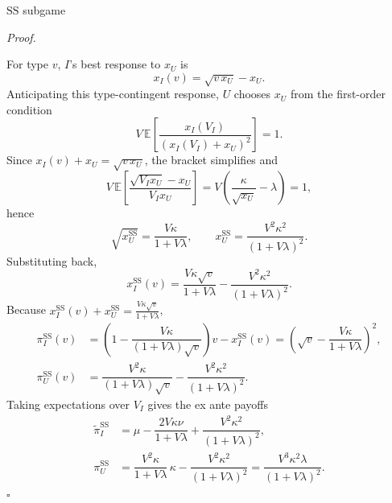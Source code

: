 \documentclass[10pt]{beamer}
\newcommand{\E}{\mathbb{E}}
\newcommand{\pt}{\widetilde{\pi}}
\newcommand{\rSS}{\mathrm{SS}}
\renewenvironment{proof}{%
  \par\smallskip\noindent\textit{Proof.}\hspace{0.6em}\ignorespaces
}{%
  \unskip\nobreak\hfill$\square$\par\smallskip
}
\begin{document}
\begin{frame}[allowframebreaks]{$\rSS$ subgame}\label{prf:ss}
  \begin{proof}
    For type $v$, $I$'s best response to $x_U$ is
    \[
      x_I(v) = \sqrt{v\,x_U} - x_U .
    \]
    Anticipating this type-contingent response, $U$ chooses $x_U$ from
    the first-order condition
    \[
      V \,\E\!\left[ \dfrac{x_I(V_I)}{\left(x_I(V_I)+x_U\right)^2} \right]
      = 1 .
    \]
    Since $x_I(v)+x_U = \sqrt{v\,x_U}$, the bracket simplifies and
    \[
      V \,\E\!\left[ \dfrac{\sqrt{V_I x_U}-x_U}{V_I x_U} \right]
      = V\!\left( \dfrac{\kappa}{\sqrt{x_U}} - \lambda \right) = 1 ,
    \]
    hence
    \[
      \sqrt{x_U^{\rSS}} = \dfrac{V\kappa}{1+V\lambda},
      \qquad
      x_U^{\rSS} = \dfrac{V^2\kappa^2}{\left(1+V\lambda\right)^2}.
    \]
    Substituting back,
    \[
      x_I^{\rSS}(v)
      = \dfrac{V\kappa\sqrt{v}}{1+V\lambda}
        - \dfrac{V^2\kappa^2}{\left(1+V\lambda\right)^2}.
    \]
    Because $x_I^{\rSS}(v)+x_U^{\rSS} = \frac{V\kappa\sqrt{v}}{1+V\lambda}$,
    \begin{align*}
      \pi_I^{\rSS}(v)
        &= \left(1 - \dfrac{V\kappa}{(1+V\lambda)\sqrt{v}}\right) v
           - x_I^{\rSS}(v)
         = \left( \sqrt{v} - \dfrac{V\kappa}{1+V\lambda} \right)^{2}, \\[4pt]
      \pi_U^{\rSS}(v)
        &= \dfrac{V^2\kappa}{(1+V\lambda)\sqrt{v}}
           - \dfrac{V^2\kappa^2}{\left(1+V\lambda\right)^2}.
    \end{align*}
    Taking expectations over $V_I$ gives the ex ante payoffs
    \begin{align*}
      \pt_I^{\rSS}
        &= \mu - \dfrac{2V\kappa\nu}{1+V\lambda}
           + \dfrac{V^2\kappa^2}{\left(1+V\lambda\right)^2}, \\[4pt]
      \pi_U^{\rSS}
        &= \dfrac{V^2\kappa}{1+V\lambda}\,\kappa
           - \dfrac{V^2\kappa^2}{\left(1+V\lambda\right)^2}
         = \dfrac{V^3\kappa^2\lambda}{\left(1+V\lambda\right)^2}.
    \end{align*}
  \end{proof}
\end{frame}
\end{document}
